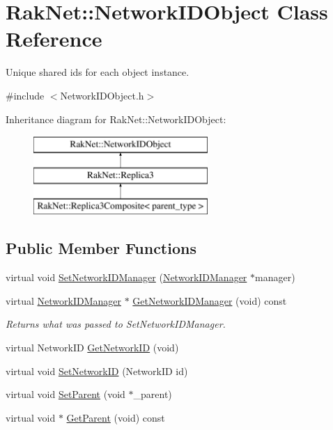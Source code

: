 \hypertarget{class_rak_net_1_1_network_i_d_object}{\section{Rak\-Net\-:\-:Network\-I\-D\-Object Class Reference}
\label{class_rak_net_1_1_network_i_d_object}
}


Unique shared ids for each object instance.  




{\ttfamily \#include $<$Network\-I\-D\-Object.\-h$>$}

Inheritance diagram for Rak\-Net\-:\-:Network\-I\-D\-Object\-:\begin{figure}[H]
\begin{center}
\leavevmode
\includegraphics[height=3.000000cm]{class_rak_net_1_1_network_i_d_object}
\end{center}
\end{figure}
\subsection*{Public Member Functions}
\begin{DoxyCompactItemize}
\item 
virtual void \hyperlink{class_rak_net_1_1_network_i_d_object_abb1048648224a0c27fea7cb04f444310}{Set\-Network\-I\-D\-Manager} (\hyperlink{class_rak_net_1_1_network_i_d_manager}{Network\-I\-D\-Manager} $\ast$manager)
\item 
\hypertarget{class_rak_net_1_1_network_i_d_object_ac3be9f98153dfb91a16d16a8a63aca3d}{virtual \hyperlink{class_rak_net_1_1_network_i_d_manager}{Network\-I\-D\-Manager} $\ast$ \hyperlink{class_rak_net_1_1_network_i_d_object_ac3be9f98153dfb91a16d16a8a63aca3d}{Get\-Network\-I\-D\-Manager} (void) const }\label{class_rak_net_1_1_network_i_d_object_ac3be9f98153dfb91a16d16a8a63aca3d}

\begin{DoxyCompactList}\small\item\em Returns what was passed to Set\-Network\-I\-D\-Manager. \end{DoxyCompactList}\item 
virtual Network\-I\-D \hyperlink{class_rak_net_1_1_network_i_d_object_a4e2454899578ba16379491fc0aa45bb6}{Get\-Network\-I\-D} (void)
\item 
virtual void \hyperlink{class_rak_net_1_1_network_i_d_object_a5ebfffe7c5bb1a87888b9c3bd940cf35}{Set\-Network\-I\-D} (Network\-I\-D id)
\item 
virtual void \hyperlink{class_rak_net_1_1_network_i_d_object_a4cc5a498e4cd73194d7406350dd7a4c6}{Set\-Parent} (void $\ast$\-\_\-parent)
\item 
virtual void $\ast$ \hyperlink{class_rak_net_1_1_network_i_d_object_a6f48e0e1854cbc49cde9e9c9f7d3f679}{Get\-Parent} (void) const 
\end{DoxyCompactItemize}
